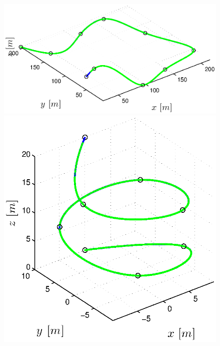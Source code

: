\begin{figure}[H]
\begin{minipage}[t]{0.32\textwidth}
  \end{minipage}
  \vspace{5pt}
  \begin{minipage}[t]{0.32\textwidth}
    \includegraphics[width = \textwidth]{trackings/figure_3D_road_SplineDegree3_crossTrack_Disturbance_0}
  \end{minipage}
  \hfill
  \begin{minipage}[t]{0.32\textwidth}
    \includegraphics[width = \textwidth]{trackings/figure_3D_helix_SplineDegree3_crossTrack_Disturbance_0}
  \end{minipage}
  \hfill
  \begin{minipage}[t]{0.32\textwidth}

\end{minipage}
\end{figure}
